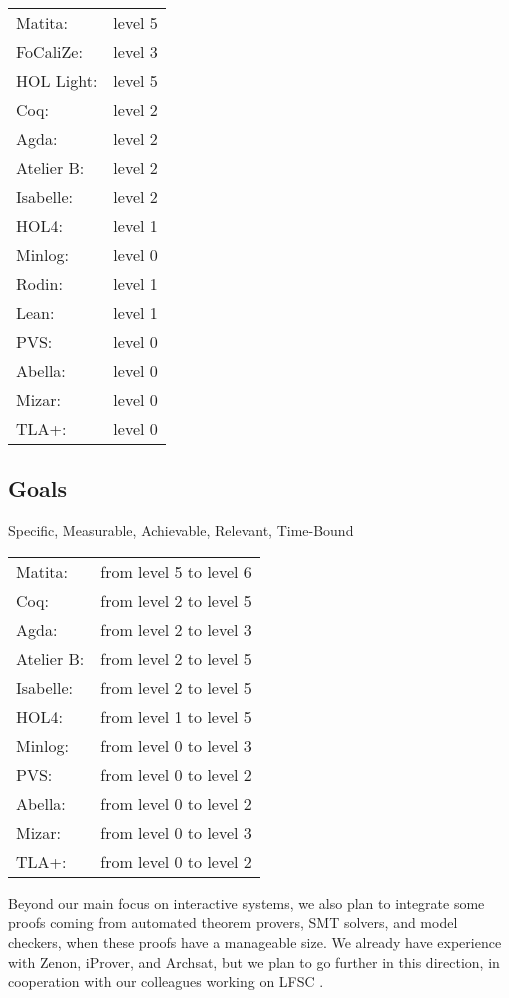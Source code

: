 \begin{tabular}{ll}
Matita:& level 5\\
FoCaliZe:& level 3\\
HOL Light:& level 5\\
Coq:& level 2\\
Agda:& level 2\\
Atelier B:& level 2\\
Isabelle:& level 2\\
HOL4:& level 1\\
Minlog:& level 0\\
Rodin:& level 1\\
Lean:& level 1\\
PVS:& level 0\\
Abella:& level 0\\
Mizar:& level 0\\
TLA+:& level 0
\end{tabular}

\subsection{Goals}

Specific, Measurable, Achievable, Relevant, Time-Bound

\begin{tabular}{ll}
Matita:& from level 5 to level 6\\
Coq:& from level 2 to level 5\\
Agda:& from level 2 to level 3\\
Atelier B:& from level 2 to level 5\\
Isabelle:& from level 2 to level 5\\
HOL4:& from level 1 to level 5\\
Minlog:& from level 0 to level 3\\
PVS:& from level 0 to level 2\\
Abella:& from level 0 to level 2\\
Mizar:& from level 0 to level 3\\
TLA+:& from level 0 to level 2
\end{tabular}


Beyond our main focus on interactive systems, we also plan to
integrate some proofs coming from automated theorem provers, SMT
solvers, and model checkers, when these proofs have a manageable
size. We already have experience with Zenon, iProver, and Archsat, but
we plan to go further in this direction, in cooperation with our
colleagues working on LFSC \cite{Stump09}.

